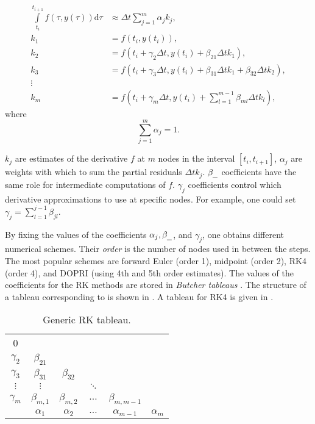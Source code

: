 \begin{align}
  \int \limits_{t_i}^{t_{i+1}} f(\tau, y(\tau)) \mathrm{d} \tau &\approx \Delta t \sum \limits_{j=1}^{m} \alpha_j k_j,\label{eq:rk_first}\\
  k_1 &= f(t_i, y(t_i)),\\
  k_2 &= f(t_i + \gamma_2 \Delta t, y(t_i) + \beta_{21} \Delta t k_1), \\
  k_3 &= f(t_i + \gamma_3 \Delta t, y(t_i) + \beta_{31} \Delta t k_1 + \beta_{32} \Delta t k_2),\\
  \vdots & \\
  k_m &= f(t_i + \gamma_m \Delta t, y(t_i) + \sum \limits_{l=1}^{m-1} \beta_{ml} \Delta t k_l), \label{eq:rk_last}
\end{align}
where
\begin{equation}
    \sum \limits_{j=1}^{m} \alpha_j = 1.
\end{equation}

$k_j$ are estimates of the derivative $f$ at $m$ nodes in the interval $[t_i, t_{i+1}]$, $\alpha_j$ are weights with which to sum the partial residuals $\Delta t k_j$. $\beta_\text{\underline{\hspace{2mm}}}$ coefficients have the same role for intermediate computations of $f$. $\gamma_j$ coefficients control which derivative approximations to use at specific nodes. For example, one could set $\gamma_j = \sum \limits_{l=1}^{j-1} \beta_{jl}$.

By fixing the values of the coefficients $\alpha_j, \beta_\text{\underline{\hspace{2mm}}}$, and $\gamma_j$, one obtains different numerical schemes. Their \emph{order} is the number of nodes used in between the steps. The most popular schemes are forward Euler (order 1), midpoint (order 2), \ac{RK}4 (order 4), and \ac{DOPRI} (using 4th and 5th order estimates). The values of the coefficients for the \ac{RK} methods are stored in \emph{Butcher tableaus} \cite{Atkinson2009}. The structure of a tableau corresponding to is shown in . A tableau for \ac{RK}4 is given in .

\begin{table}
  \centering
  \caption{Generic \acl{RK} tableau.}
  \begin{tabular}{c | c c c c c}
    0 & & & & &\\
    $\gamma_2$ & $\beta_{21}$ & & & &\\
    $\gamma_3$ & $\beta_{31}$ & $\beta_{32}$ & & &\\
    $\vdots$ & $\vdots$ & & $\ddots$ & &\\ 
    $\gamma_m$ & $\beta_{m,1}$ & $\beta_{m,2}$ & $\dots$ & $\beta_{m,m-1}$ &\\ \hline
           & $\alpha_1$ & $\alpha_2$ & $\dots$ & $\alpha_{m-1}$ & $\alpha_m$ \\
  \end{tabular}
  \label{tab:rk_tableau}
\end{table}

